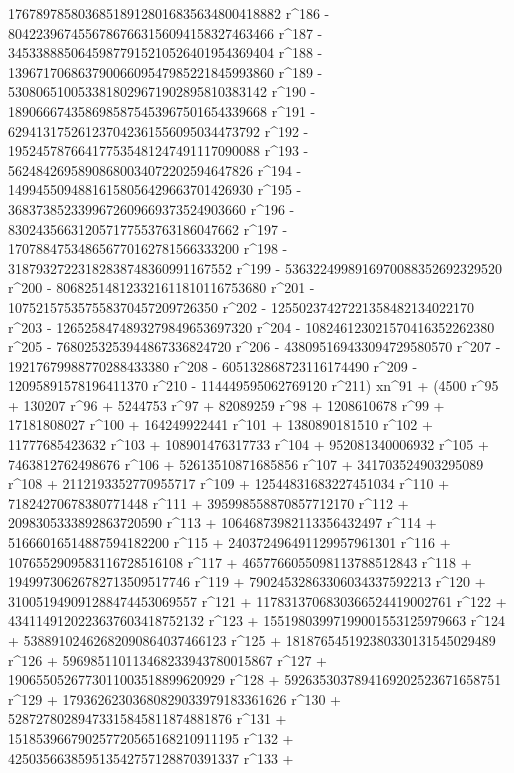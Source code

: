        176789785803685189128016835634800418882 r^186 - 
       80422396745567867663156094158327463466 r^187 - 
       34533888506459877915210526401954369404 r^188 - 
       13967170686379006609547985221845993860 r^189 - 
       5308065100533818029671902895810383142 r^190 - 
       1890666743586985875453967501654339668 r^191 - 
       629413175261237042361556095034473792 r^192 - 
       195245787664177535481247491117090088 r^193 - 
       56248426958908680034072202594647826 r^194 - 
       14994550948816158056429663701426930 r^195 - 
       3683738523399672609669373524903660 r^196 - 
       830243566312057177553763186047662 r^197 - 
       170788475348656770162781566333200 r^198 - 
       31879327223182838748360991167552 r^199 - 
       5363224998916970088352692329520 r^200 - 
       806825148123321611810116753680 r^201 - 
       107521575357558370457209726350 r^202 - 
       12550237427221358482134022170 r^203 - 
       1265258474893279849653697320 r^204 - 
       108246123021570416352262380 r^205 - 
       7680253253944867336824720 r^206 - 
       438095169433094729580570 r^207 - 
       19217679988770288433380 r^208 - 605132868723116174490 r^209 - 
       12095891578196411370 r^210 - 
       114449595062769120 r^211) xn^91 + (4500 r^95 + 130207 r^96 + 
       5244753 r^97 + 82089259 r^98 + 1208610678 r^99 + 
       17181808027 r^100 + 164249922441 r^101 + 1380890181510 r^102 + 
       11777685423632 r^103 + 108901476317733 r^104 + 
       952081340006932 r^105 + 7463812762498676 r^106 + 
       52613510871685856 r^107 + 341703524903295089 r^108 + 
       2112193352770955717 r^109 + 12544831683227451034 r^110 + 
       71824270678380771448 r^111 + 395998558870857712170 r^112 + 
       2098305333892863720590 r^113 + 10646873982113356432497 r^114 + 
       51666016514887594182200 r^115 + 
       240372496491129957961301 r^116 + 
       1076552909583116728516108 r^117 + 
       4657766055098113788512843 r^118 + 
       19499730626782713509517746 r^119 + 
       79024532863306034337592213 r^120 + 
       310051949091288474453069557 r^121 + 
       1178313706830366524419002761 r^122 + 
       4341149120223637603418752132 r^123 + 
       15519803997199001553125979663 r^124 + 
       53889102462682090864037466123 r^125 + 
       181876545192380330131545029489 r^126 + 
       596985110113468233943780015867 r^127 + 
       1906550526773011003518899620929 r^128 + 
       5926353037894169202523671658751 r^129 + 
       17936262303680829033979183361626 r^130 + 
       52872780289473315845811874881876 r^131 + 
       151853966790257720565168210911195 r^132 + 
       425035663859513542757128870391337 r^133 + 
